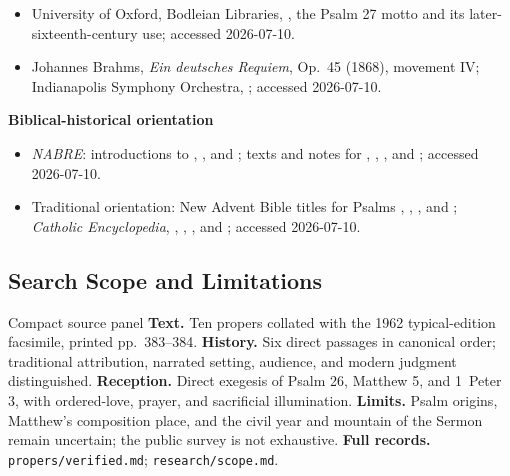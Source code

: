 \begin{deepstudy}
{\begin{itemize}[itemsep=0em,topsep=0.15em,parsep=0pt]
\item University of Oxford, Bodleian Libraries, , the Psalm 27 motto and its later-sixteenth-century use; accessed 2026-07-10.
\item Johannes Brahms, \emph{Ein deutsches Requiem}, Op.~45 (1868), movement IV; Indianapolis Symphony Orchestra, ; accessed 2026-07-10.
\end{itemize}
}

\textbf{Biblical-historical orientation}
{\footnotesize
\begin{itemize}[itemsep=0em,topsep=0.15em,parsep=0pt]
\item \emph{NABRE}: introductions to , , and ; texts and notes for , , , and ; accessed 2026-07-10.
\item Traditional orientation: New Advent Bible titles for Psalms , , , and ; \emph{Catholic Encyclopedia}, , , , and ; accessed 2026-07-10.
\end{itemize}
}

\subsection*{Search Scope and Limitations}

\begin{studybox}{Compact source panel}
\textbf{Text.} Ten propers collated with the 1962 typical-edition facsimile, printed pp.~383--384. \textbf{History.} Six direct passages in canonical order; traditional attribution, narrated setting, audience, and modern judgment distinguished. \textbf{Reception.} Direct exegesis of Psalm 26, Matthew 5, and 1~Peter 3, with ordered-love, prayer, and sacrificial illumination. \textbf{Limits.} Psalm origins, Matthew's composition place, and the civil year and mountain of the Sermon remain uncertain; the public survey is not exhaustive. \textbf{Full records.} \nolinkurl{propers/verified.md}; \nolinkurl{research/scope.md}.
\end{studybox}


\end{deepstudy}
